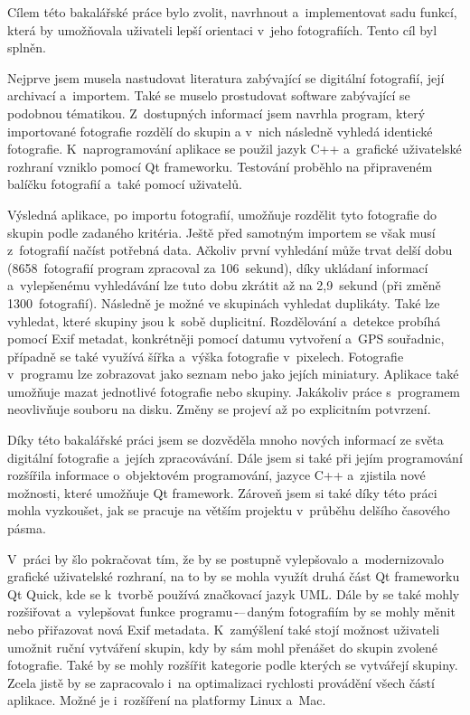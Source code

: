 Cílem této bakalářské práce bylo zvolit, navrhnout a~implementovat sadu funkcí, která by umožňovala uživateli lepší orientaci v~jeho fotografiích. Tento cíl byl splněn.

Nejprve jsem musela nastudovat literatura zabývající se digitální fotografií, její archivací a~importem. Také se muselo prostudovat software zabývající se podobnou tématikou. Z~dostupných informací jsem navrhla program, který importované fotografie rozdělí do skupin a v~nich následně vyhledá identické fotografie. K~naprogramování aplikace se použil jazyk C++ a~grafické uživatelské rozhraní vzniklo pomocí Qt frameworku. Testování proběhlo na připraveném balíčku fotografií a~také pomocí uživatelů.

Výsledná aplikace, po importu fotografií, umožňuje rozdělit tyto fotografie do skupin podle zadaného kritéria. Ještě před samotným importem se však musí z~fotografií načíst potřebná data. Ačkoliv první vyhledání může trvat delší dobu (8658~fotografií program zpracoval za 106~sekund), díky ukládaní informací a~vylepšenému vyhledávání lze tuto dobu zkrátit až na 2,9~sekund (při změně 1300~fotografií). Následně je možné ve skupinách vyhledat duplikáty. Také lze vyhledat, které skupiny jsou k~sobě duplicitní. Rozdělování a~detekce probíhá pomocí Exif metadat, konkrétněji pomocí datumu vytvoření a~GPS souřadnic, případně se také využívá šířka a~výška fotografie v~pixelech. Fotografie v~programu lze zobrazovat jako seznam nebo jako jejích miniatury. Aplikace také umožňuje mazat jednotlivé fotografie nebo skupiny. Jakákoliv práce s~programem neovlivňuje souboru na disku. Změny se projeví až po explicitním potvrzení.

Díky této bakalářské práci jsem se dozvěděla mnoho nových informací ze světa digitální fotografie a~jejích zpracovávání. Dále jsem si také při jejím programování rozšířila informace o~objektovém programování, jazyce C++ a~zjistila nové možnosti, které umožňuje Qt framework. Zároveň jsem si také díky této práci mohla vyzkoušet, jak se pracuje na větším projektu v~průběhu delšího časového pásma.

V~práci by šlo pokračovat tím, že by se postupně vylepšovalo a~modernizovalo grafické uživatelské rozhraní, na to by se mohla využít druhá část Qt frameworku Qt Quick, kde se k~tvorbě používá značkovací jazyk UML. Dále by se také mohly rozšiřovat a~vylepšovat funkce programu\,-–\,daným fotografiím by se mohly měnit nebo přiřazovat nová Exif metadata. K~zamýšlení také stojí možnost uživateli umožnit ruční vytváření skupin, kdy by sám mohl přenášet do skupin zvolené fotografie. Také by se mohly rozšířit kategorie podle kterých se vytvářejí skupiny. Zcela jistě by se zapracovalo i~na optimalizaci rychlosti provádění všech částí aplikace. Možné je i~rozšíření na platformy Linux a~Mac.
